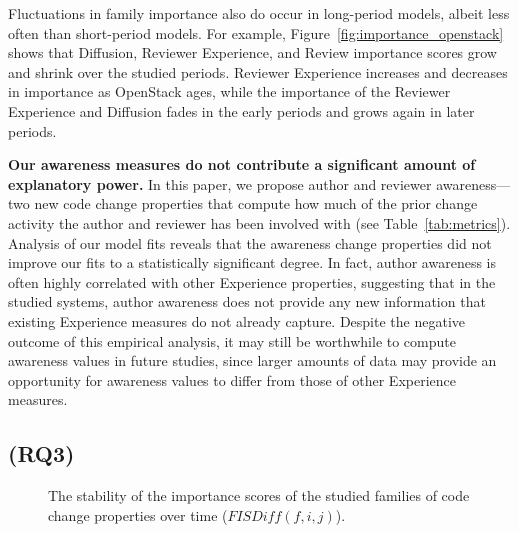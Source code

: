 Fluctuations in family importance also do occur in long-period models, albeit less often than short-period models.
For example, Figure~\ref{fig:importance_openstack} shows that Diffusion, Reviewer Experience, and Review importance scores grow and shrink over the studied periods.
Reviewer Experience increases and decreases in importance as {\sc OpenStack} ages, while the importance of the Reviewer Experience and Diffusion fades in the early periods and grows again in later periods.

\textbf{Our awareness measures do not contribute a significant amount of explanatory power.}
In this paper, we propose author and reviewer awareness---two new code change properties that compute how much of the prior change activity the author and reviewer has been involved with (see Table~\ref{tab:metrics}).
Analysis of our model fits reveals that the awareness change properties did not improve our fits to a statistically significant degree.
In fact, author awareness is often highly correlated with other Experience properties, suggesting that in the studied systems, author awareness does not provide any new information that existing Experience measures do not already capture.
Despite the negative outcome of this empirical analysis, it may still be worthwhile to compute awareness values in future studies, since larger amounts of data may provide an opportunity for awareness values to differ from those of other Experience measures.


\subsection*{(RQ3) \rqiii}

\begin{figure}[t]
  \centering
  \vspace{-2mm}
  \qquad
  \caption{The stability of the importance scores of the studied families of code change properties over time ($\textit{FISDiff}(f,i,j)$).}
  \label{fig:stability}
\end{figure}

